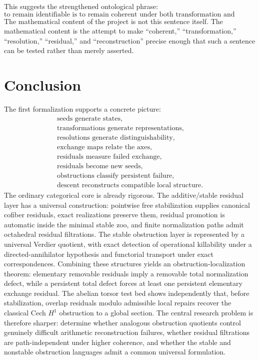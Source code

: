 \documentclass[11pt]{article}
\theoremstyle{definition}
\theoremstyle{remark}
\begin{document}
This suggests the strengthened ontological phrase:
\[
\boxed{
\text{to remain identifiable is to remain coherent under both transformation and resolution.}
}
\]
The mathematical content of the project is not this sentence itself. The mathematical content is the attempt to make ``coherent,'' ``transformation,'' ``resolution,'' ``residual,'' and ``reconstruction'' precise enough that such a sentence can be tested rather than merely asserted.

\section{Conclusion}

The first formalization supports a concrete picture:
\[
\boxed{
\begin{array}{c}
\text{seeds generate states},\\
\text{transformations generate representations},\\
\text{resolutions generate distinguishability},\\
\text{exchange maps relate the axes},\\
\text{residuals measure failed exchange},\\
\text{residuals become new seeds},\\
\text{obstructions classify persistent failure},\\
\text{descent reconstructs compatible local structure}.
\end{array}
}
\]
The ordinary categorical core is already rigorous. The additive/stable residual layer has a universal construction: pointwise free stabilization supplies canonical cofiber residuals, exact realizations preserve them, residual promotion is automatic inside the minimal stable zoo, and finite normalization paths admit octahedral residual filtrations. The stable obstruction layer is represented by a universal Verdier quotient, with exact detection of operational killability under a directed-annihilator hypothesis and functorial transport under exact correspondences. Combining these structures yields an obstruction-localization theorem: elementary removable residuals imply a removable total normalization defect, while a persistent total defect forces at least one persistent elementary exchange residual. The abelian torsor test bed shows independently that, before stabilization, overlap residuals modulo admissible local repairs recover the classical Cech $H^1$ obstruction to a global section. The central research problem is therefore sharper: determine whether analogous obstruction quotients control genuinely difficult arithmetic reconstruction failures, whether residual filtrations are path-independent under higher coherence, and whether the stable and nonstable obstruction languages admit a common universal formulation.
\end{document}
